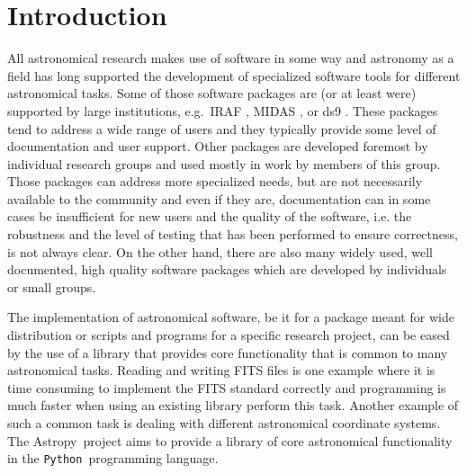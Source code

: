 \documentclass[modern]{aastex61}
\newcommand{\package}[1]{\texttt{#1}}
\newcommand{\python}{\package{Python}}
\newcommand{\astropy}{Astropy}
\begin{document}
\section{Introduction} \label{sec:intro}
All astronomical research makes use of software in some way and
astronomy as a field has long supported the development of specialized
software tools for different astronomical tasks. Some of those
software packages are (or at least were) supported by large
institutions, e.g.\ IRAF \citep[developed at NOAO,][]{IRAF}, MIDAS
\citep[developed at ESO,][]{MIDAS}, or ds9 \citep[developed at
%
%
  SAO,][]{ds9}. These packages tend to address a wide range of users
and they typically provide some level of documentation and user
support. Other packages are developed foremost by individual research
groups and used mostly in work by members of this group. Those
packages can address more specialized needs, but are not necessarily
available to the community and even if they are, documentation can in
some cases be insufficient for new users and the quality of the
software, i.e. the robustness and the level of testing that has been
performed to ensure correctness, is not always clear. On the other
hand, there are also many widely used, well documented, high quality
software packages which are developed by individuals or small groups.

The implementation of astronomical software, be it for a package meant
for wide distribution or scripts and programs for a specific research
project, can be eased by the use of a library that provides core
functionality that is common to many astronomical tasks. Reading and
writing FITS files is one example where it is time
consuming to implement the FITS standard correctly and
programming is much faster when using an existing library perform this
task. Another example of such a common task is dealing with different
astronomical coordinate systems. The \astropy\ project aims to provide a
library of core astronomical functionality in the \python\ programming
language.
\end{document}
